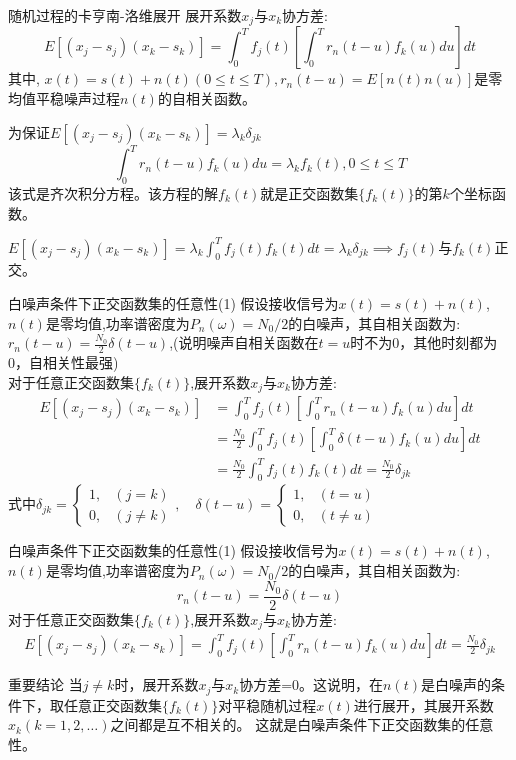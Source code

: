 \begin{frame}{随机过程的卡亨南-洛维展开}
展开系数$x_j$与$x_k$协方差:
\[E[(x_j-s_j)(x_k-s_k)]=\int_{0}^{T}f_j(t)\left[\int_{0}^{T}r_n(t-u)f_k(u)du\right]dt \]
其中, $x(t)=s(t)+n(t)(0\le t\le T),r_n(t-u)=E[n(t)n(u)]$是零均值平稳噪声过程$n(t)$的自相关函数。

为保证$E[(x_j-s_j)(x_k-s_k)]=\lambda_k\delta_{jk}$
\[\int_{0}^{T}r_n(t-u)f_k(u)du=\lambda_kf_k(t), 0\le t\le T \]
该式是齐次积分方程。该方程的解$f_k(t)$就是正交函数集$\{f_k(t) \}$的第$k$个坐标函数。

$E[(x_j-s_j)(x_k-s_k)]=\lambda_k\int_{0}^{T}f_j(t)f_k(t)dt=\lambda_k\delta_{jk}\implies f_j(t)$与$f_k(t)$正交。
\end{frame}

\begin{frame}{白噪声条件下正交函数集的任意性(1)}
假设接收信号为$x(t)=s(t)+n(t)$, $n(t)$是零均值,功率谱密度为$P_n(\omega)=N_0/2$的白噪声，其自相关函数为: $r_n(t-u)=\frac{N_0}{2}\delta(t-u)$,(说明噪声自相关函数在$t=u$时不为0，其他时刻都为0，自相关性最强)\\
对于任意正交函数集$\{f_k(t)\}$,展开系数$x_j$与$x_k$协方差:
\begin{align*}
E[(x_j-s_j)(x_k-s_k)]&=\int_{0}^{T}f_j(t)\left[\int_{0}^{T}r_n(t-u)f_k(u)du\right]dt\\
&=\frac{N_0}{2}\int_{0}^{T}f_j(t)\left[\int_{0}^{T}\delta(t-u)f_k(u)du\right]dt\\
&=\frac{N_0}{2}\int_{0}^{T}f_j(t)f_k(t)dt=\frac{N_0}{2}\delta_{jk}
\end{align*}
式中$\delta_{jk}=
\begin{cases}
1, & (j=k)\\
0, & (j\ne k) 
\end{cases},\quad
\delta(t-u)=
\begin{cases}
	1, & (t=u)\\
	0, & (t\ne u) 
\end{cases}
$
\end{frame}

\begin{frame}{白噪声条件下正交函数集的任意性(1)}
假设接收信号为$x(t)=s(t)+n(t)$, $n(t)$是零均值,功率谱密度为$P_n(\omega)=N_0/2$的白噪声，其自相关函数为: 
\[r_n(t-u)=\frac{N_0}{2}\delta(t-u)\]
对于任意正交函数集$\{f_k(t)\}$,展开系数$x_j$与$x_k$协方差:
\begin{align*}
E[(x_j-s_j)(x_k-s_k)]=\int_{0}^{T}f_j(t)\left[\int_{0}^{T}r_n(t-u)f_k(u)du\right]dt=\frac{N_0}{2}\delta_{jk}
\end{align*}
\begin{block}{重要结论}
	当$j\ne k$时，展开系数$x_j$与$x_k$协方差=0。这说明，在$n(t)$是白噪声的条件下，取任意正交函数集$\{f_k(t)\}$对平稳随机过程$x(t)$进行展开，其展开系数$x_k(k=1,2,\dots)$之间都是互不相关的。
	这就是白噪声条件下正交函数集的任意性。
\end{block}
\end{frame}

